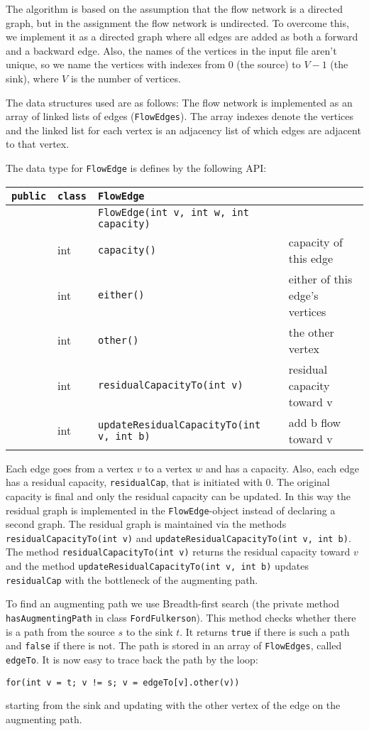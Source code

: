 \documentclass{tufte-handout}
\begin{document}
The algorithm is based on the assumption that the flow network is a directed graph, but in the assignment the flow network is undirected. To overcome this, we implement it as a directed graph where all edges are added as both a forward and a backward edge. Also, the names of the vertices in the input file aren't unique, so we name the vertices with indexes from 0 (the source) to $V-1$ (the sink), where $V$ is the number of vertices.

The data structures used are as follows: The flow network is implemented as an array of linked lists of edges (\verb#FlowEdges#). The array indexes denote the vertices and the linked list for each vertex is an adjacency list of which edges are adjacent to that vertex. 

The data type for \verb#FlowEdge# is defines by the following API:

  \bigskip
 \begin{tabular}{llll}
	\verb#public# 	& \verb#class# 	& \verb#FlowEdge# 						& \\\midrule
					&				& \verb#FlowEdge(int v, int w, int capacity)#	& \\
					& int			& \verb#capacity()#							& capacity of this edge \\
					& int			& \verb#either()#									& either of this edge's vertices \\
					& int 			& \verb#other()#									& the other vertex \\
					& int 			& \verb#residualCapacityTo(int v)#			& residual capacity toward v \\
					& int 			& \verb#updateResidualCapacityTo(int v, int b)# & add b flow toward v
\end{tabular}
\smallskip

Each edge goes from a vertex $v$ to a vertex $w$ and has a capacity. Also, each edge has a residual capacity, \verb#residualCap#, that is initiated with 0. The original capacity is final and only the residual capacity can be updated. In this way the residual graph is implemented in the \verb#FlowEdge#-object instead of declaring a second graph. The residual graph is maintained via the methods \verb#residualCapacityTo(int v)# and \verb#updateResidualCapacityTo(int v, int b)#. The method \verb#residualCapacityTo(int v)# returns the residual capacity toward $v$ and the method \verb#updateResidualCapacityTo(int v, int b)# updates \verb#residualCap# with the bottleneck of the augmenting path.
  
To find an augmenting path we use Breadth-first search (the private method \verb#hasAugmentingPath# in class \verb#FordFulkerson#). This method checks whether there is a path from the source $s$ to the sink $t$. It returns \verb#true# if there is such a path and \verb#false# if there is not. The path is stored in an array of \verb#FlowEdges#, called \verb#edgeTo#. It is now easy to trace back the path by the loop:
\begin{verbatim}
for(int v = t; v != s; v = edgeTo[v].other(v)) 
\end{verbatim}
starting from the sink and updating with the other vertex of the edge on the augmenting path. 
\end{document}
